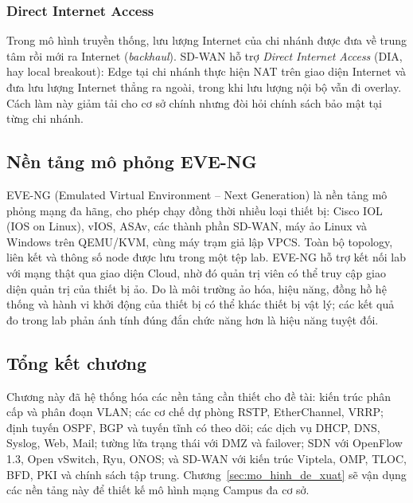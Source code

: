 \subsubsection{Direct Internet Access}

Trong mô hình truyền thống, lưu lượng Internet của chi nhánh được đưa về trung tâm rồi mới ra Internet (\textit{backhaul}). SD-WAN hỗ trợ \textit{Direct Internet Access} (DIA, hay local breakout): Edge tại chi nhánh thực hiện NAT trên giao diện Internet và đưa lưu lượng Internet thẳng ra ngoài, trong khi lưu lượng nội bộ vẫn đi overlay. Cách làm này giảm tải cho cơ sở chính nhưng đòi hỏi chính sách bảo mật tại từng chi nhánh.

\subsection{Nền tảng mô phỏng EVE-NG}

EVE-NG (Emulated Virtual Environment -- Next Generation) là nền tảng mô phỏng mạng đa hãng, cho phép chạy đồng thời nhiều loại thiết bị: Cisco IOL (IOS on Linux), vIOS, ASAv, các thành phần SD-WAN, máy ảo Linux và Windows trên QEMU/KVM, cùng máy trạm giả lập VPCS. Toàn bộ topology, liên kết và thông số node được lưu trong một tệp lab. EVE-NG hỗ trợ kết nối lab với mạng thật qua giao diện Cloud, nhờ đó quản trị viên có thể truy cập giao diện quản trị của thiết bị ảo. Do là môi trường ảo hóa, hiệu năng, đồng hồ hệ thống và hành vi khởi động của thiết bị có thể khác thiết bị vật lý; các kết quả đo trong lab phản ánh tính đúng đắn chức năng hơn là hiệu năng tuyệt đối.

\subsection{Tổng kết chương}

Chương này đã hệ thống hóa các nền tảng cần thiết cho đề tài: kiến trúc phân cấp và phân đoạn VLAN; các cơ chế dự phòng RSTP, EtherChannel, VRRP; định tuyến OSPF, BGP và tuyến tĩnh có theo dõi; các dịch vụ DHCP, DNS, Syslog, Web, Mail; tường lửa trạng thái với DMZ và failover; SDN với OpenFlow 1.3, Open vSwitch, Ryu, ONOS; và SD-WAN với kiến trúc Viptela, OMP, TLOC, BFD, PKI và chính sách tập trung. Chương~\ref{sec:mo_hinh_de_xuat} sẽ vận dụng các nền tảng này để thiết kế mô hình mạng Campus đa cơ sở.
